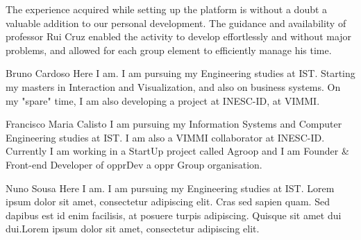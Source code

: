 \documentclass[a4paper,12pt,journal,twoside,compsoc]{PPIEEEtran}
\begin{document}
The experience acquired while setting up the platform is without a doubt a valuable addition to our personal development. The guidance and availability of professor Rui Cruz enabled the activity to develop effortlessly and without major problems, and allowed for each group element to efficiently manage his time.


%

% 
\begin{IEEEbiography}{Bruno Cardoso}
Here I am. I am pursuing my Engineering studies at \ac{IST}. Starting my masters in Interaction and Visualization, and also on business systems. On my "spare" time, I am also developing a project at INESC-ID, at VIMMI.
\end{IEEEbiography}
\begin{IEEEbiography}
{Francisco Maria Calisto}
I am pursuing my Information Systems and Computer  Engineering studies at \ac{IST}. I am also a VIMMI collaborator at INESC-ID. Currently I am working in a StartUp project called Agroop and I am Founder \& Front-end Developer of opprDev a oppr Group organisation.
\end{IEEEbiography}
\begin{IEEEbiography}
{Nuno Sousa}
Here I am. I am pursuing my Engineering studies at \ac{IST}. Lorem ipsum dolor sit amet, consectetur adipiscing elit. Cras sed sapien quam. Sed dapibus est id enim facilisis, at posuere turpis adipiscing. Quisque sit amet dui dui.Lorem ipsum dolor sit amet, consectetur adipiscing elit. 
\end{IEEEbiography}
\end{document}
